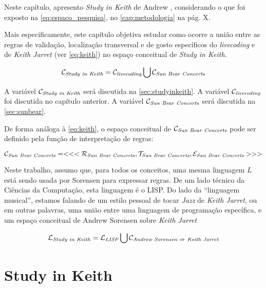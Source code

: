 Neste capítulo, apresento \emph{Study in Keith} de Andrew \cite{sorensen_study_2009}, considerando o que foi exposto na \autoref{eq:espaco_pesquisa}, no \autoref{cap:metodologia} na pág. X.

Mais especificamente, este capítulo objetiva estudar como ocorre a união entre as regras de validação, localização transversal e de gosto específicos do \emph{livecoding} e de \emph{Keith Jarret} (ver \autoref{eq:keith}) no espaço conceitual de \emph{Study in Keith}.

\begin{equation}
\mathcal{C}_\emph{Study in Keith} = \mathcal{C}_\emph{livecoding} \bigcup \mathcal{C}_\emph{Sun Bear Concerts}
\end{equation}\label{eq:espaco_pesquisa}

A variável $\mathcal{C}_\emph{Study in Keith}$ será discutida na \autoref{sec:studyinkeith}. A variável $\mathcal{C}_\emph{livecoding}$ foi discutida no capítulo anterior. A variável $\mathcal{C}_\emph{Sun Bear Concerts}$ será discutida na \autoref{sec:sunbear}.

De forma análoga à \autoref{eq:keith}, o espaço conceitual de $\mathcal{C}_\emph{Sun Bear Concerts}$ pode ser definido pela função de interpretação de regras:

\begin{equation}
\mathcal{C}_\emph{Sun Bear Concerts} = <<<\mathcal{R}_\emph{Sun Bear Concerts}, \mathcal{T}_\emph{Sun Bear Concerts},  \mathcal{E}_\emph{Sun Bear Concerts} >>> 
\end{equation}\label{eq:sunbear}

Neste trabalho, assumo que, para todos os conceitos, uma mesma linguagem $L$ está sendo usada por Sorensen para expressar regras. De um lado técnico da Ciências da Computação, esta linguagem é o LISP. Do lado da ``linguagem musical'', estamos falando de um estilo pessoal de tocar \emph{Jazz} de \emph{Keith Jarret}, ou em outras palavras, uma união entre uma linguagem de programação específica, e um espaço conceitual de Andrew Sorensen sobre \emph{Keith Jarret}

\begin{equation}
\mathcal{L}_\emph{Study in Keith} = \mathcal{L}_\emph{LISP} \bigcup \mathcal{C}_\emph{Andrew Sorensen $\Rightarrow$ Keith Jarret}
\end{equation}\label{eq:sunbear}

\section{Study in Keith}\label{sec:studyinkeith}

